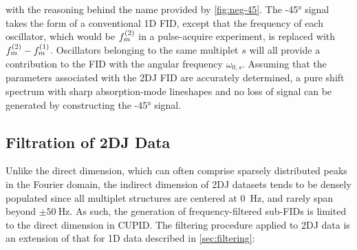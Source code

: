 with the reasoning behind the name provided by \cref{fig:neg-45}.
The \ang{-45} signal
takes the form of a conventional \ac{1D} \ac{FID},
except that the frequency of each oscillator, which would be $f^{(2)}_m$ in a
pulse-acquire experiment,
is replaced with $f^{(2)}_m - f^{(1)}_m$. Oscillators belonging to the same
multiplet $s$ will all provide a contribution to the \ac{FID} with the
angular frequency $\omega_{0,s}$.
Assuming that the parameters associated with the \ac{2DJ}
\ac{FID} are accurately determined, a pure shift spectrum with sharp
absorption-mode lineshapes and no loss of signal can be generated by
constructing the \ang{-45} signal.


\subsection{Filtration of \ac{2DJ} Data}
\label{subsec:jres-filtering}
Unlike the direct dimension, which can often comprise sparsely distributed
peaks in the Fourier domain, the indirect dimension of \ac{2DJ} datasets tends
to be densely populated since all multiplet structures are centered at
\qty{0}{\hertz}, and rarely span beyond $\pm \qty{50}{\hertz}$. As such,
the generation of frequency-filtered sub-\acp{FID} is limited to
the direct dimension in \ac{CUPID}.
The filtering procedure applied to \ac{2DJ} data is an extension of that
for \ac{1D} data described in \cref{sec:filtering}:
